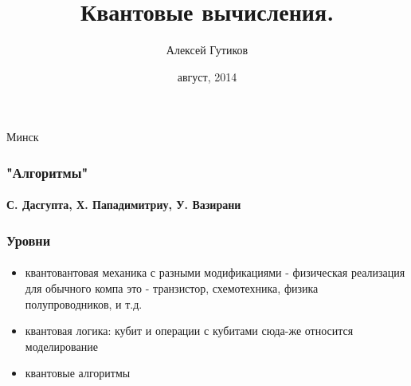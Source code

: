 \documentclass{beamer}
\title[Квантовые вычисления]
{Квантовые вычисления.}
\author{Алексей Гутиков}
\date{август, 2014}
\begin{document}
\begin{frame}
\titlepage
\center Минск
\end{frame}

\begin {frame}
\frametitle {"Алгоритмы"}
\framesubtitle {С. Дасгупта, Х. Пападимитриу, У. Вазирани}



\end {frame}


\begin {frame}
\frametitle {Уровни}
\framesubtitle {}

	\begin{itemize}
	\item квантовантовая механика с разными модификациями - физическая реализация
	для обычного компа это - транзистор, схемотехника, физика полупроводников, и т.д.
	\item квантовая логика: кубит и операции с кубитами
	сюда-же относится моделирование
	\item квантовые алгоритмы
	\end{itemize}

\end {frame}
\end{document}
